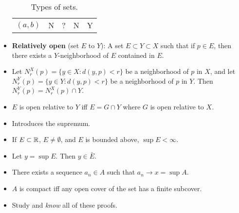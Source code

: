 \documentclass[../../notes.tex]{subfiles}
\begin{document}
\begin{itemize}
\begin{table}[h!]
\begin{tabular}{l|c|c|c|c}
            $(a,b)$ & N & ? & N & Y\\
        \end{tabular}
        \caption{Types of sets.}
        \label{tab:typesSets}
    \end{table}
    \item \textbf{Relatively open} (set $E$ to $Y$): A set $E\subset Y\subset X$ such that if $p\in E$, then there exists a $Y$-neighborhood of $E$ contained in $E$.
    \item Let $N_r^X(p)=\{y\in X:d(y,p)<r\}$ be a neighborhood of $p$ in $X$, and let $N_r^Y(p)=\{y\in Y:d(y,p)<r\}$ be a neighborhood of $p$ in $Y$. Then $N_r^Y(p)=N_r^X(p)\cap Y$.
    \item $E$ is open relative to $Y$ iff $E=G\cap Y$ where $G$ is open relative to $X$.
    \item Introduces the supremum.
    \item If $E\subset\mathbb{R}$, $E\neq\emptyset$, and $E$ is bounded above, $\sup E<\infty$.
    \item Let $y=\sup E$. Then $y\in\bar{E}$.
    \item There exists a sequence $a_n\in A$ such that $a_n\to x=\sup A$.
    \item $A$ is compact iff any open cover of the set has a finite subcover.
    \item Study and \emph{know} all of these proofs.
\end{itemize}
\end{document}
